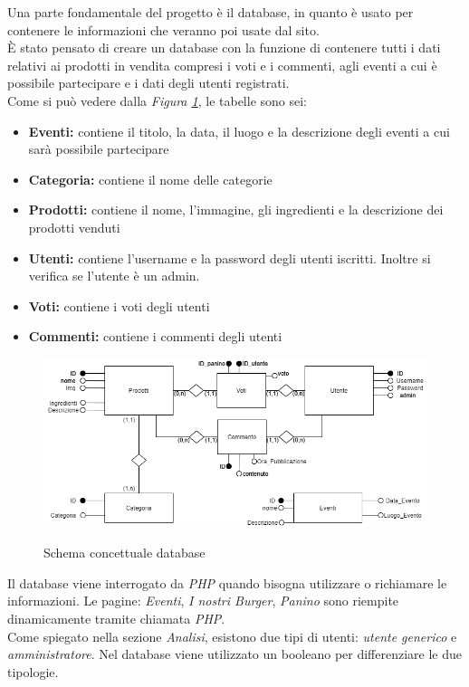 Una parte fondamentale del progetto è il database, in quanto è usato per contenere le informazioni che veranno poi usate dal sito.\\
È stato pensato di creare un database con la funzione di contenere tutti i dati relativi ai prodotti in vendita compresi i voti e i commenti, agli eventi a cui è possibile partecipare e i dati degli utenti registrati.\\
Come si può vedere dalla \emph{Figura \ref{Fig:schemadb}}, le tabelle sono sei:
\begin{itemize}
		\item \textbf{Eventi:} contiene il titolo, la data, il luogo e la descrizione degli eventi a cui sarà possibile partecipare
		\item \textbf{Categoria:} contiene il nome delle categorie
		\item \textbf{Prodotti:} contiene il nome, l'immagine, gli ingredienti e la descrizione dei prodotti venduti
		\item \textbf{Utenti:} contiene l'username e la password degli utenti iscritti. Inoltre si verifica se l'utente è un admin.
        \item \textbf{Voti:} contiene i voti degli utenti
        \item \textbf{Commenti:} contiene i commenti degli utenti
\end{itemize}
\begin{figure}[!h]
	\centering	%
	\includegraphics[width=0.7\linewidth]{../database/DiagrammaER.png}\\
    \caption{Schema concettuale database}
	\label{Fig:schemadb}
\end{figure}
Il database viene interrogato da \emph{PHP} quando bisogna utilizzare o richiamare le informazioni.
Le pagine: \emph{Eventi}, \emph{I nostri Burger}, \emph{Panino} sono riempite dinamicamente tramite chiamata \emph{PHP}.\\
Come spiegato nella sezione \emph{Analisi}, esistono due tipi di utenti: \emph{utente generico} e \emph{amministratore}. Nel database viene utilizzato un booleano per differenziare le due tipologie.\\ 